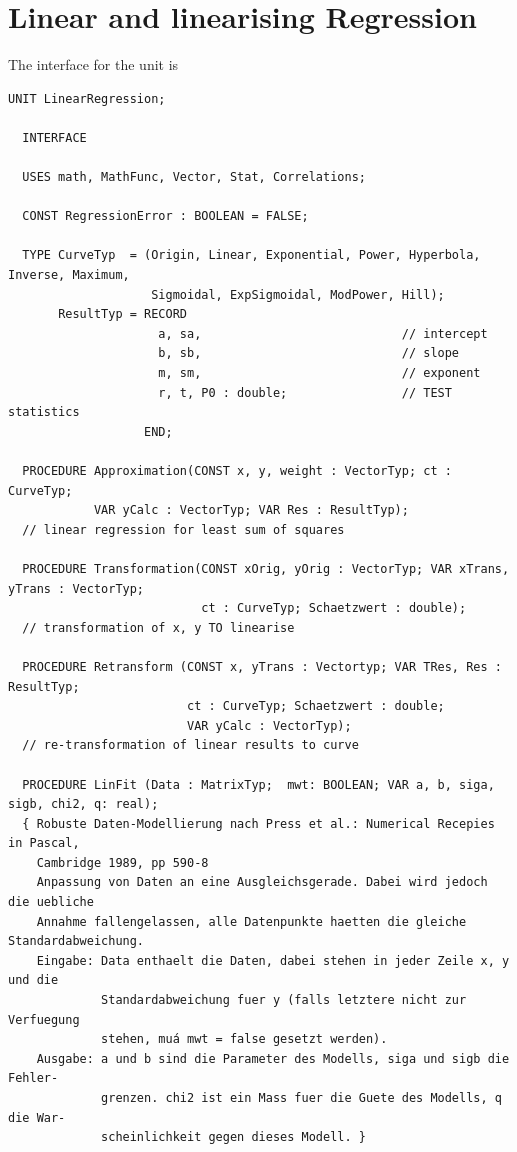 \chapter{Linear and linearising Regression}
\begin{refsection}


The interface for the unit is
\begin{lstlisting}[caption=Interface]
  UNIT LinearRegression;

  INTERFACE

  USES math, MathFunc, Vector, Stat, Correlations;

  CONST RegressionError : BOOLEAN = FALSE;

  TYPE CurveTyp  = (Origin, Linear, Exponential, Power, Hyperbola, Inverse, Maximum,
                    Sigmoidal, ExpSigmoidal, ModPower, Hill);
       ResultTyp = RECORD
                     a, sa,                            // intercept
                     b, sb,                            // slope
                     m, sm,                            // exponent
                     r, t, P0 : double;                // TEST statistics
                   END;

  PROCEDURE Approximation(CONST x, y, weight : VectorTyp; ct : CurveTyp;
            VAR yCalc : VectorTyp; VAR Res : ResultTyp);
  // linear regression for least sum of squares

  PROCEDURE Transformation(CONST xOrig, yOrig : VectorTyp; VAR xTrans, yTrans : VectorTyp;
                           ct : CurveTyp; Schaetzwert : double);
  // transformation of x, y TO linearise

  PROCEDURE Retransform (CONST x, yTrans : Vectortyp; VAR TRes, Res : ResultTyp;
                         ct : CurveTyp; Schaetzwert : double;
                         VAR yCalc : VectorTyp);
  // re-transformation of linear results to curve

  PROCEDURE LinFit (Data : MatrixTyp;  mwt: BOOLEAN; VAR a, b, siga, sigb, chi2, q: real);
  { Robuste Daten-Modellierung nach Press et al.: Numerical Recepies in Pascal,
    Cambridge 1989, pp 590-8
    Anpassung von Daten an eine Ausgleichsgerade. Dabei wird jedoch die uebliche
    Annahme fallengelassen, alle Datenpunkte haetten die gleiche Standardabweichung.
    Eingabe: Data enthaelt die Daten, dabei stehen in jeder Zeile x, y und die
             Standardabweichung fuer y (falls letztere nicht zur Verfuegung
             stehen, muá mwt = false gesetzt werden).
    Ausgabe: a und b sind die Parameter des Modells, siga und sigb die Fehler-
             grenzen. chi2 ist ein Mass fuer die Guete des Modells, q die War-
             scheinlichkeit gegen dieses Modell. }


\end{lstlisting}
\end{refsection}
